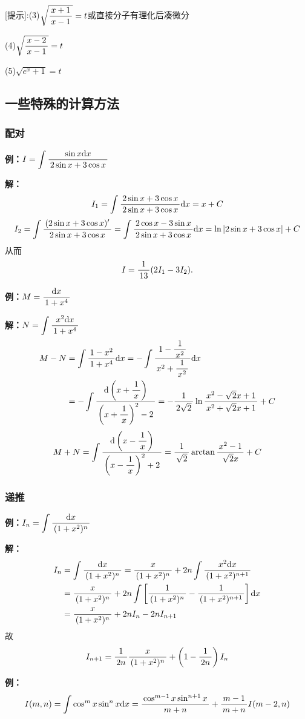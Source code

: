 [提示]:(3)$\sqrt{\df{x+1}{x-1}}=t$或直接分子有理化后凑微分

(4)$\sqrt{\df{x-2}{x-1}}=t$

(5)$\sqrt{e^x+1}=t$

\subsection{一些特殊的计算方法}

\subsubsection{配对}

{\bf 例：}$I=\dint\df{\sin x\d x}{2\sin x+3\cos x}$

{\bf 解：}
$$I_1=\dint\df{2\sin x+3\cos x}{2\sin x+3\cos x}\d x=x+C$$
$$I_2=\dint\df{(2\sin x+3\cos x)'}{2\sin x+3\cos x}
=\dint\df{2\cos x-3\sin x}{2\sin x+3\cos x}\d x=\ln|2\sin x+3\cos x|+C$$
从而
$$I=\df1{13}(2I_1-3I_2).$$
\fin

{\bf 例：}$M=\df{\d x}{1+x^4}$

{\bf 解：}$N=\dint\df{x^2\d x}{1+x^4}$
\begin{align}
M-N&=\dint\df{1-x^2}{1+x^4}\d x=-\dint\df{1-\df1{x^2}}{x^2+\df1{x^2}}\d
x\notag\\
&=-\dint\df{\d\left(x+\df1x\right)}{\left(x+\df1x\right)^2-2}
=-\df1{2\sqrt2}\ln\df{x^2-\sqrt2x+1}{x^2+\sqrt2x+1}+C\notag
\end{align}
$$M+N=\dint\df{\d\left(x-\df1x\right)}{\left(x-\df1x\right)^2+2}
=\df1{\sqrt2}\arctan\df{x^2-1}{\sqrt2x}+C$$
\fin

\subsubsection{递推}

{\bf 例：}$I_n=\dint\df{\d x}{(1+x^2)^n}$

{\bf 解：}
\begin{align}
I_n&=\dint\df{\d x}{(1+x^2)^n}=\df x{(1+x^2)^n}+2n\dint\df{x^2\d x}
{(1+x^2)^{n+1}}\notag\\
&=\df x{(1+x^2)^n}+2n\dint\left[\df1{(1+x^2)^n}-
\df1{(1+x^2)^{n+1}}\right]\d x\notag\\
&=\df x{(1+x^2)^n}+2nI_n-2nI_{n+1}\notag
\end{align}
故
$$I_{n+1}=\df1{2n}\df x{(1+x^2)^n}+\left(1-\df1{2n}\right)I_n$$
\fin

{\bf 例：}
$$I(m,n)=\dint\cos^mx\sin^nx\d x=
\df{\cos^{m-1}x\sin^{n+1}x}{m+n}+\df{m-1}{m+n}I(m-2,n)$$

